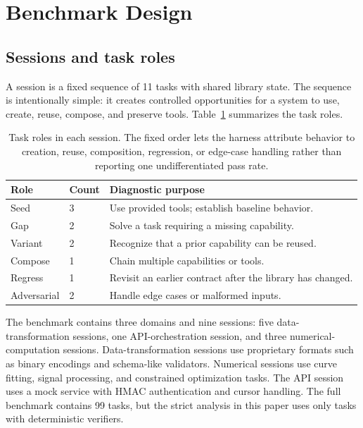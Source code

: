\documentclass[sigconf,anonymous,review,natbib=false]{acmart}
\begin{document}
\section{Benchmark Design}

\subsection{Sessions and task roles}

A session is a fixed sequence of 11 tasks with shared library state. The sequence is intentionally simple: it creates controlled opportunities for a system to use, create, reuse, compose, and preserve tools. Table~\ref{tab:task-types} summarizes the task roles.

\begin{table}[t]
\centering
\small
\caption{Task roles in each session. The fixed order lets the harness attribute behavior to creation, reuse, composition, regression, or edge-case handling rather than reporting one undifferentiated pass rate.}
\label{tab:task-types}
\begin{tabular}{llp{4.5cm}}
\toprule
\textbf{Role} & \textbf{Count} & \textbf{Diagnostic purpose} \\
\midrule
Seed & 3 & Use provided tools; establish baseline behavior. \\
Gap & 2 & Solve a task requiring a missing capability. \\
Variant & 2 & Recognize that a prior capability can be reused. \\
Compose & 1 & Chain multiple capabilities or tools. \\
Regress & 1 & Revisit an earlier contract after the library has changed. \\
Adversarial & 2 & Handle edge cases or malformed inputs. \\
\bottomrule
\end{tabular}
\end{table}

The benchmark contains three domains and nine sessions: five data-transformation sessions, one API-orchestration session, and three numerical-computation sessions. Data-transformation sessions use proprietary formats such as binary encodings and schema-like validators. Numerical sessions use curve fitting, signal processing, and constrained optimization tasks. The API session uses a mock service with HMAC authentication and cursor handling. The full benchmark contains 99 tasks, but the strict analysis in this paper uses only tasks with deterministic verifiers.
\end{document}
